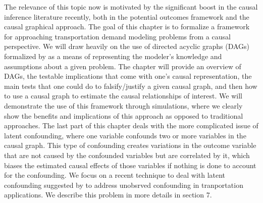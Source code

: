 The relevance of this topic now is motivated by the significant boost in the causal inference literature recently, both in the potential outcomes framework and the causal graphical approach.
The goal of this chapter is to formalize a framework for approaching 
transportation demand modeling problems from a causal perspective. 
We will draw heavily on the use of directed acyclic graphs (DAGs) formalized by \citet{pearl_causality_2000} as a means of representing the modeler's knowledge and assumptions about a given problem. 
The chapter will provide an overview of DAGs, the 
testable implications that come with one's causal representation, the main 
tests that one could do to falsify/justify a given causal graph, and then how 
to use a causal graph to estimate the causal relationships of interest. 
We will demonstrate the use of this framework through simulations, where we 
clearly show the benefits and implications of this approach as opposed to 
traditional approaches. 
The last part of this chapter deals with the more complicated issue of latent 
confounding, where one variable confounds two or more variables in the causal 
graph. This type of confounding creates variations in the outcome variable that are not caused by 
the confounded variables but are correlated by it, which biases the estimated 
causal effects of those variables if nothing is done to account for the 
confounding. 
We focus on a recent technique to deal with latent confounding suggested by \citet{wang_2019_blessings} to address unobsrved confounding in tranportation applications. 
We describe this problem in more details in section 7.
